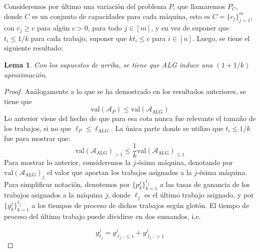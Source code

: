 \documentclass[10pt]{article}
\newcommand{\val}[1]{\text{val}(#1)}
\theoremstyle{plain}
\newtheorem{lem}{Lema}
\theoremstyle{definition}
\begin{document}
Consideremos por \'ultimo una variaci\'on del problema $P$, que llamaremos $P_C$, donde $C$ es un conjunto de capacidades para cada m\'aquina, esto es $C = \{c_j\}_{j = 1}^m$, con $c_j \geq c$ para alg\'un $c>0$, para todo $j\in [m]$, y en vez de suponer que $t_i \leq 1/k$ para cada trabajo, suponer que $kt_i \leq c$ para $i \in [n]$. Luego, se tiene el siguiente resultado:
\begin{lem}
\label{lem:CasoCapVar}
Con los supuestos de arriba, se tiene que ALG induce una $(1+1/k)$ aproximaci\'on. 
\end{lem}
\begin{proof}
An\'alogamente a lo que se ha demostrado en los resultados anteriores, se tiene que
$$
\val{\mathcal{A}_P} \leq \val{\mathcal{A}_{\text{ALG}}}
$$
Lo anterior viene del hecho de que para esa cota nunca fue relevante el tama\~no de los trabajos, si no que $\ell_P \leq \ell_{\text{ALG}}$. La \'unica parte donde se utilizo que $t_i \leq 1/k$ fue para mostrar que:
$$
\val{\mathcal{A}_{\text{ALG}}}_{> 1} \leq \frac{1}{k} \val{\mathcal{A}_{\text{ALG}}}_{ \leq 1}
$$
Para mostrar lo anterior, consideremos la $j$-\'esima m\'aquina, denotando  por $\val{\mathcal{A}_{\text{ALG}}}_{j}$ el valor que aportan los trabajos asignados a la $j$-ésima máquina. Para simplificar notación, denotemos por $\{p^j_k\}_{k=1}^{\ell_j}$ a las tasas de ganancia de los trabajos asignados a la máquina $j$, donde $\ell_j$ es el último trabajo asignado, y por $\{y^j_k\}_{k=1}^{\ell_j}$ a los tiempos de proceso de dichos trabajos según glotón. El tiempo de proceso del último trabajo puede dividirse en dos sumandos, i.e.

$$
y^j_{\ell_j} = y^j_{\ell_j, \leq 1} + y^j_{\ell_j, > 1}
$$


\end{proof}
\end{document}

